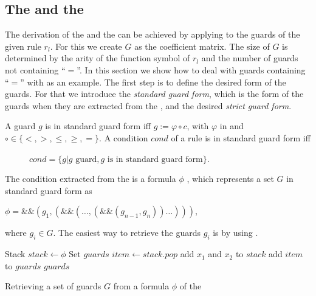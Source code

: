 \subsection{The \guardmatrix and the \guardconstants}
\label{sec:derivation-guard}
The derivation of the \guardmatrix and the \guardconstants can be achieved by applying  to the guards of the given rule $r_l$. For this we create $G$ as the coefficient matrix. The size of $G$ is determined by the arity of the function symbol of $r_l$ and the number of guards not containing ``$=$''. In this section we show how to deal with guards containing ``$=$'' with  as an example. The first step is to define the desired form of the guards. For that we introduce the \textit{standard guard form}, which is the form of the guards when they are extracted from the \seg, and the desired \textit{strict guard form}.
\begin{definition}
	A guard $g$ is in standard guard form iff
	$g := \varphi \circ c$, with
	$\varphi$ in \stdLinInt and $\circ \in \{ <, >, \le, \ge, = \}$.\newline
	A condition $cond$ of a rule is in standard guard form iff 
	\begin{figure}[H]
		\centering
		$cond = \{ g | g\text{ guard}, g\text{ is in standard guard form}\}$.
	\end{figure}
\end{definition} 
The condition extracted from the \seg is a formula $\phi$ , which represents a set $G$  in standard guard form as 
\begin{center}
	$\phi = \&\&(g_1,( \&\& (\dots,(\&\&(g_{n-1},g_n) )\dots)))$,
\end{center}
where $g_i \in G$.\newline
The easiest way to retrieve the guards $g_i$ is by using .

\begin{algorithm}
	\begin{algorithmic}[1]
		 
			\State Stack $stack \gets \phi$
			\State Set $guards$
				\State $item \gets stack.pop$
					
					\State add $x_1$ and $x_2$ to $stack$
				\Else
					\State add $item$ to $guards$	
				\EndIf				
			\EndWhile	
			\State \Return $guards$
		\EndFunction		
	\end{algorithmic}
	\caption{Retrieving a set of guards $G$ from a formula $\phi$ of the \stdG}
	\label{algo:decat-guards}
\end{algorithm}

